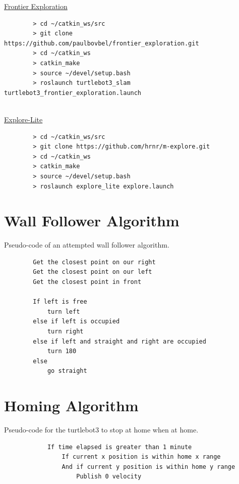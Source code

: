\documentclass[11pt, a4, nocenter, margin=150mm]{article}
\begin{document}
\begin{appendices}
	\underline{Frontier Exploration}
	\begin{verbatim}
		> cd ~/catkin_ws/src
		> git clone https://github.com/paulbovbel/frontier_exploration.git
		> cd ~/catkin_ws
		> catkin_make
		> source ~/devel/setup.bash
		> roslaunch turtlebot3_slam turtlebot3_frontier_exploration.launch
	\end{verbatim}
	~\\

	\underline{Explore-Lite}
	\begin{verbatim}
		> cd ~/catkin_ws/src
		> git clone https://github.com/hrnr/m-explore.git
		> cd ~/catkin_ws
		> catkin_make
		> source ~/devel/setup.bash
		> roslaunch explore_lite explore.launch
	\end{verbatim}

\section{Wall Follower Algorithm}
\label{app:wall_follower_algorithm}

	Pseudo-code of an attempted wall follower algorithm.
	~\\

	\begin{verbatim}
		Get the closest point on our right
		Get the closest point on our left
		Get the closest point in front

		If left is free
		    turn left
		else if left is occupied
		    turn right
		else if left and straight and right are occupied
		    turn 180
		else
		    go straight 
	\end{verbatim}

\section{Homing Algorithm}
\label{app:homing_algorithm}
	
		Pseudo-code for the turtlebot3 to stop at home when at home.
		~\\
	
		\begin{verbatim}
			If time elapsed is greater than 1 minute
			    If current x position is within home x range
			    And if current y position is within home y range
			        Publish 0 velocity
		\end{verbatim}
	

\end{appendices}
\end{document}
